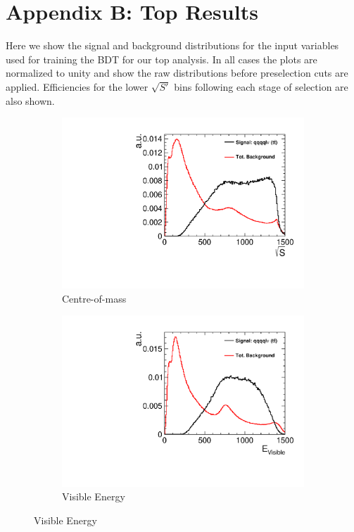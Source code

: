 \chapter{Appendix B: Top Results}
\label{appendixB}

Here we show the signal and background distributions for the input variables used for training the BDT for our top analysis. In all cases the plots are normalized to unity and show the raw distributions before preselection cuts are applied. Efficiencies for the lower $\sqrt{S'}$ bins following each stage of selection are also shown. 


\begin{figure}[b] 
  \begin{subfigure}[b]{0.5\linewidth}
    \centering
    \includegraphics[width=0.75\linewidth]{TopAnalysis/figures/BDTVariables/EnergyConstraintAlt} 
    \caption{Centre-of-mass} 
    \vspace{4ex}
  \end{subfigure}%
  \begin{subfigure}[b]{0.5\linewidth}
    \centering
    \includegraphics[width=0.75\linewidth]{TopAnalysis/figures/BDTVariables/VisibleEnergy} 
    \caption{Visible Energy} 
    \vspace{4ex}
  \end{subfigure} 
\end{figure}

